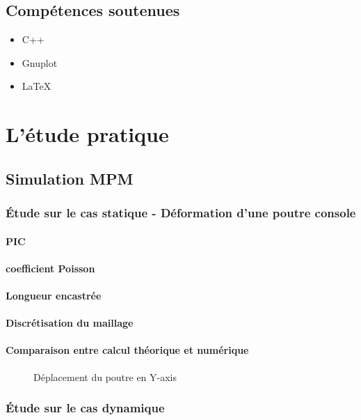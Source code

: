 \documentclass[a4paper,12pt]{report}
\begin{document}
\section{Compétences soutenues}
\begin{itemize}
      \item C++
      \item Gnuplot
      \item LaTeX
\end{itemize}


\chapter{L'étude pratique}
\section{Simulation MPM}
\subsection{Étude sur le cas statique - Déformation d'une poutre console}
\subsubsection{PIC}
\subsubsection{coefficient Poisson}
\subsubsection{Longueur encastrée}
\subsubsection{Discrétisation du maillage}
\subsubsection{Comparaison entre calcul théorique et numérique}
                                \begin{figure}
                                   \small 
                                    \caption{Déplacement du poutre en Y-axis}
                                \end{figure}
\subsection{Étude sur le cas dynamique}
\end{document}
